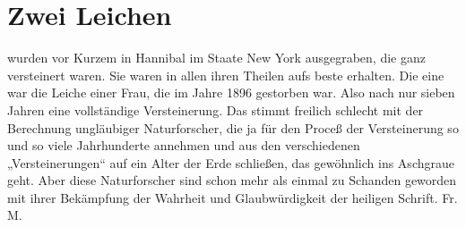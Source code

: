 \chapter[Zwei Leichen]{Zwei Leichen}
wurden vor Kurzem in Hannibal im Staate New York ausgegraben, die ganz versteinert waren. Sie waren in allen ihren Theilen aufs beste erhalten. Die eine war die Leiche einer Frau, die im Jahre 1896 gestorben war. Also nach nur sieben Jahren eine vollständige Versteinerung. Das stimmt freilich schlecht mit der Berechnung ungläubiger Naturforscher, die ja für den Proceß der Versteinerung so und so viele Jahrhunderte annehmen und aus den verschiedenen „Versteinerungen“ auf ein Alter der Erde schließen, das gewöhnlich ins Aschgraue geht. Aber diese Naturforscher sind schon mehr als einmal zu Schanden geworden mit ihrer Bekämpfung der Wahrheit und Glaubwürdigkeit der heiligen Schrift. Fr. M.
